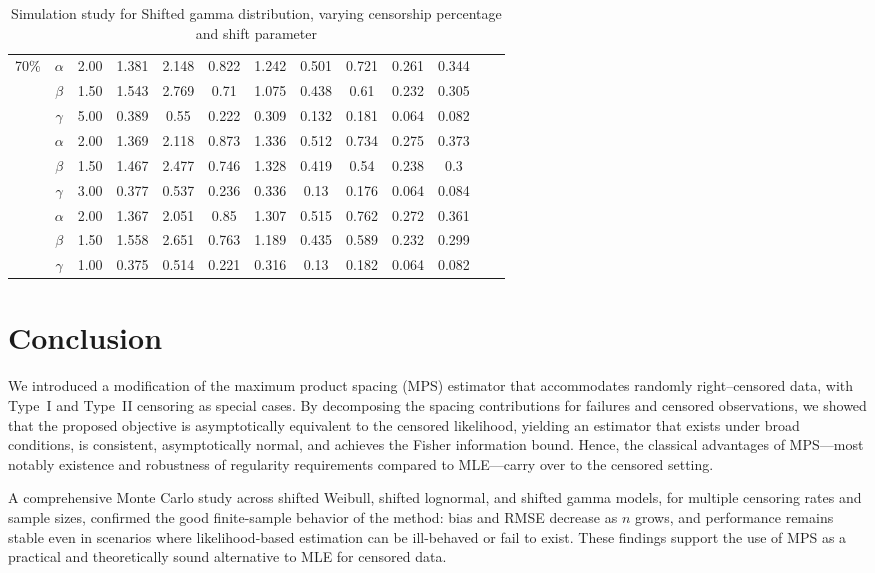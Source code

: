 \documentclass[10pt,a4paper,onecolumn]{article} %
\begin{document}
\begin{table}[H]
\begin{tabular}{ccccccccccccc}
 \hline
70\% & $\alpha$ & 2.00 & 1.381 & 2.148 & 0.822 & 1.242 & 0.501 & 0.721 & 0.261 & 0.344 \\ 
   & $\beta$ & 1.50 & 1.543 & 2.769 & 0.71 & 1.075 & 0.438 & 0.61 & 0.232 & 0.305 \\ 
   & $\gamma$ & 5.00 & 0.389 & 0.55 & 0.222 & 0.309 & 0.132 & 0.181 & 0.064 & 0.082 \\ \cmidrule{2-11}
   & $\alpha$ & 2.00 & 1.369 & 2.118 & 0.873 & 1.336 & 0.512 & 0.734 & 0.275 & 0.373 \\ 
   & $\beta$ & 1.50 & 1.467 & 2.477 & 0.746 & 1.328 & 0.419 & 0.54 & 0.238 & 0.3 \\ 
   & $\gamma$ & 3.00 & 0.377 & 0.537 & 0.236 & 0.336 & 0.13 & 0.176 & 0.064 & 0.084 \\ \cmidrule{2-11}
   & $\alpha$ & 2.00 & 1.367 & 2.051 & 0.85 & 1.307 & 0.515 & 0.762 & 0.272 & 0.361 \\ 
   & $\beta$ & 1.50 & 1.558 & 2.651 & 0.763 & 1.189 & 0.435 & 0.589 & 0.232 & 0.299 \\ 
   & $\gamma$ & 1.00 & 0.375 & 0.514 & 0.221 & 0.316 & 0.13 & 0.182 & 0.064 & 0.082 \\ 
   \hline
\end{tabular}
\caption{Simulation study for Shifted gamma distribution, varying censorship percentage and shift parameter}\label{Simulation_Gamma}
\end{table}

\section{Conclusion}
We introduced a modification of the maximum product spacing (MPS) estimator that accommodates randomly right--censored data, with Type~I and Type~II censoring as special cases. By decomposing the spacing contributions for failures and censored observations, we showed that the proposed objective is asymptotically equivalent to the censored likelihood, yielding an estimator that exists under broad conditions, is consistent, asymptotically normal, and achieves the Fisher information bound. Hence, the classical advantages of MPS—most notably existence and robustness of regularity requirements compared to MLE—carry over to the censored setting.

A comprehensive Monte Carlo study across shifted Weibull, shifted lognormal, and shifted gamma models, for multiple censoring rates and sample sizes, confirmed the good finite-sample behavior of the method: bias and RMSE decrease as $n$ grows, and performance remains stable even in scenarios where likelihood-based estimation can be ill-behaved or fail to exist. These findings support the use of MPS as a practical and theoretically sound alternative to MLE for censored data.
\end{document}
